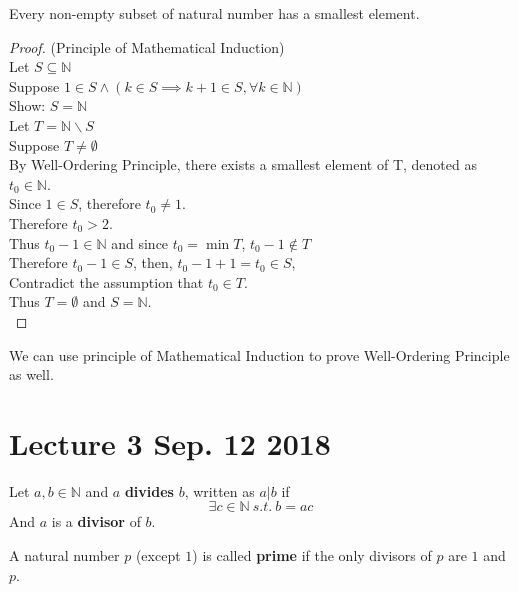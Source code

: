 \documentclass[10pt]{article}
\begin{document}
	\begin{theorem}
		Every non-empty subset of natural number has a smallest element.
	\end{theorem}

	\begin{proof} (Principle of Mathematical Induction)\\
		Let $S \subseteq \mathbb{N}$ \\
		Suppose $1 \in S \land (k \in S \implies k+1 \in S, \forall k \in \mathbb{N})$ \\
		Show: $S = \mathbb{N}$ \\
		Let $T = \mathbb{N} \backslash S$ \\
		Suppose $T \neq \emptyset$ \\
		By Well-Ordering Principle, there exists a smallest element of T, denoted as $t_0 \in \mathbb{N}$. \\
		Since $1 \in S$, therefore $t_0 \neq 1$. \\
		Therefore $t_0 > 2$. \\
		Thus $t_0 - 1 \in \mathbb{N}$ and since $t_0 = \min{T}$, $t_0 - 1 \notin T$ \\
		Therefore $t_0 - 1 \in S$, then, $t_0 - 1 + 1 = t_0 \in S$, \\
		Contradict the assumption that $t_0 \in T$. \\
		Thus $T = \emptyset$ and $S = \mathbb{N}$. \\
	\end{proof}
	
	\begin{remark}
		We can use principle of Mathematical Induction to prove Well-Ordering Principle as well.
	\end{remark}
	
	\section{Lecture 3 Sep. 12 2018}
	\begin{definition}
		Let $a, b \in \mathbb{N}$ and $a$ \textbf{divides} $b$, written as $a | b$ if 
		\[
			\exists c \in \mathbb{N}\ s.t.\ b = ac
		\]
		And $a$ is a \textbf{divisor} of $b$.
	\end{definition}
	
	\begin{definition}
		A natural number $p$ (except $1$) is called \textbf{prime} if the only divisors of $p$ are $1$ and $p$.
	\end{definition}
	
\end{document}
